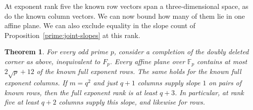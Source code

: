 \documentclass[11pt,a4paper]{article}
\newtheorem{theorem}{Theorem}[section]
\numberwithin{equation}{section}
\begin{document}
At exponent rank five the known row vectors span a three-dimensional space, as do the known column vectors. We can now bound how many of them lie in one affine plane. We can also exclude equality in the slope count of Proposition~\ref{prime:joint-slopes} at this rank.

\begin{theorem}\label{prime:corner-planes}
For every odd prime $p$, consider a completion of the doubly deleted corner as above, inequivalent to $F_p$. Every affine plane over $\mathbb F_p$ contains at most $2\sqrt p+12$ of the known full exponent rows. The same holds for the known full exponent columns. If $m=q^2$ and just $q+1$ columns supply slope $1$ on pairs of known rows, then the full exponent rank is at least $q+3$. In particular, at rank five at least $q+2$ columns supply this slope, and likewise for rows.
\end{theorem}
\end{document}
